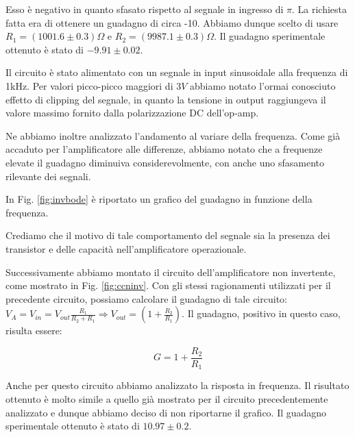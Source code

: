 Esso è negativo in quanto sfasato rispetto al segnale in ingresso di $\pi$.
La richiesta fatta era di ottenere un guadagno di circa -10.
Abbiamo dunque scelto di usare $R_1=(1001.6\pm0.3)\Omega$ e $R_2=(9987.1\pm0.3)\Omega$.
Il guadagno sperimentale ottenuto è stato di $-9.91 \pm 0.02$.

Il circuito è stato alimentato con un segnale in input sinusoidale alla frequenza di 1kHz.
Per valori picco-picco maggiori di $3V$ abbiamo notato l'ormai conosciuto effetto di clipping del segnale, in quanto la tensione in output raggiungeva il valore massimo fornito dalla polarizzazione DC dell'op-amp. 

Ne abbiamo inoltre analizzato l'andamento al variare della frequenza.
Come già accaduto per l'amplificatore alle differenze, abbiamo notato che a frequenze elevate il guadagno diminuiva considerevolmente, con anche uno sfasamento rilevante dei segnali.

In Fig. \ref{fig:invbode} è riportato un grafico del guadagno in funzione della frequenza. 

Crediamo che il motivo di tale comportamento %
del segnale sia la presenza dei transistor e delle capacità nell'amplificatore operazionale.

Successivamente abbiamo montato il circuito dell'amplificatore non invertente, come mostrato in Fig. \ref{fig:ccninv}. Con gli stessi ragionamenti utilizzati per il precedente circuito, possiamo calcolare il guadagno di tale circuito: $V_A=V_{in}=V_{out}\frac{R_1}{R_2+R_1} \Rightarrow V_{out}=(1+\frac{R_2}{R_1})$. Il guadagno, positivo in questo caso, risulta essere: 

\begin{equation}
G=1+\frac{R_2}{R_1}
\end{equation}

Anche per questo circuito abbiamo analizzato la risposta in frequenza.
Il risultato ottenuto è molto simile a quello già mostrato per il circuito precedentemente analizzato e dunque abbiamo deciso di non riportarne il grafico. Il guadagno sperimentale ottenuto è stato di $10.97 \pm 0.2$.
